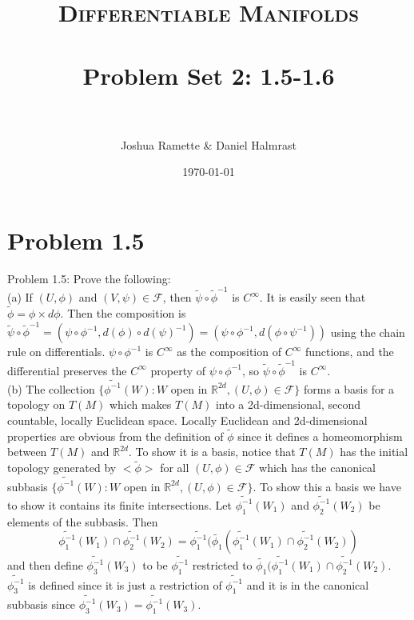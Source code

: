 \documentclass[paper=a4, fontsize=11pt]{scrartcl} %
\title{	
\normalfont \normalsize 
\textsc{Differentiable Manifolds} \\ [25pt] %
\horrule{0.5pt} \\[0.4cm] %
\huge Problem Set 2: 1.5-1.6 \\ %
\horrule{2pt} \\[0.5cm] %
}
\author{Joshua Ramette \& Daniel Halmrast} %
\date{\normalsize\today} %
\numberwithin{equation}{section} %
\numberwithin{figure}{section} %
\numberwithin{table}{section} %
\begin{document}
\maketitle %


\section*{Problem 1.5}
Problem 1.5: Prove the following: \\

(a) If $(U, \phi)$ and $(V, \psi) \in \mathscr{F}$, then $\widetilde{\psi} \circ \tilde{\phi}^{-1}$ is $C^{\infty}$. It is easily seen that $\tilde{\phi} = \phi \times d\phi$. Then the composition is $\widetilde{\psi} \circ \tilde{\phi}^{-1} = (\psi \circ \phi^{-1}, d(\phi) \circ d(\psi)^{-1}) = (\psi \circ \phi^{-1}, d(\phi \circ \psi^{-1}))$ using the chain rule on differentials. $\psi \circ \phi^{-1}$ is $C^{\infty}$ as the composition of $C^{\infty}$ functions, and the differential preserves the $C^{\infty}$ property of $\psi \circ \phi^{-1}$, so $\widetilde{\psi} \circ \tilde{\phi}^{-1}$ is $C^{\infty}$. \\

(b) The collection $\{\tilde{\phi^{-1}}(W): W$ open in $\mathbb{R}^{2d}, (U, \phi) \in  \mathscr{F} \}     $ forms a basis for a topology on $T(M)$ which makes $T(M)$ into a 2d-dimensional, second countable, locally Euclidean space. Locally Euclidean and 2d-dimensional properties are obvious from the definition of $\tilde{\phi}$ since it defines a homeomorphism between $T(M)$ and $\mathbb{R}^{2d}$. To show it is a basis, notice that $T(M)$ has the initial topology generated by $<\tilde{\phi}>$ for all $(U, \phi) \in \mathscr{F}  $ which has the canonical subbasis $\{\tilde{\phi^{-1}}(W): W$ open in $\mathbb{R}^{2d}, (U, \phi) \in  \mathscr{F} \} $. To show this a basis we have to show it contains its finite intersections. Let $\tilde{\phi_1^{-1}}(W_1)$ and $\tilde{\phi_2^{-1}}(W_2)$ be elements of the subbasis. Then 
\[
\tilde{\phi_1^{-1}}(W_1) \cap \tilde{\phi_2^{-1}}(W_2) = \tilde{\phi_1^{-1}}(\tilde{\phi_1}(\tilde{\phi_1^{-1}}(W_1) \cap \tilde{\phi_2^{-1}}(W_2))
\]
and then define $\tilde{\phi_3^{-1}}(W_3)$ to be $\tilde{\phi_1^{-1}} $ restricted to $\tilde{\phi_1}(\tilde{\phi_1^{-1}}(W_1) \cap \tilde{\phi_2^{-1}}(W_2)$. $\tilde{\phi_3^{-1}}$ is defined since it is just a restriction of $\tilde{\phi_1^{-1}}$ and it is in the canonical subbasis since $\tilde{\phi_3^{-1}}(W_3) = \tilde{\phi_1^{-1}}(W_3)$. \\
\end{document}
